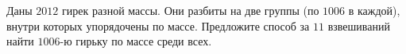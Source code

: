 \documentclass{article}
\begin{document}
Даны $2012$ гирек разной массы. Они разбиты на две группы (по $1006$ в каждой), внутри которых упорядочены по массе. 
Предложите способ за $11$ взвешиваний найти $1006$-ю гирьку по массе среди всех.
\end{document}
